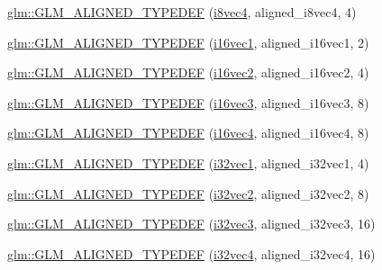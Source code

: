 \begin{DoxyCompactItemize}
\item 
\mbox{\hyperlink{group__gtx__type__aligned_ga1fe6fc032a978f1c845fac9aa0668714}{glm\+::\+G\+L\+M\+\_\+\+A\+L\+I\+G\+N\+E\+D\+\_\+\+T\+Y\+P\+E\+D\+EF}} (\mbox{\hyperlink{group__gtc__type__precision_gafbf10a778016eba57d44beb585f2dc49}{i8vec4}}, aligned\+\_\+i8vec4, 4)
\item 
\mbox{\hyperlink{group__gtx__type__aligned_gaa4161e7a496dc96972254143fe873e55}{glm\+::\+G\+L\+M\+\_\+\+A\+L\+I\+G\+N\+E\+D\+\_\+\+T\+Y\+P\+E\+D\+EF}} (\mbox{\hyperlink{group__gtc__type__precision_gacec84a02174e44363dd105769fb22473}{i16vec1}}, aligned\+\_\+i16vec1, 2)
\item 
\mbox{\hyperlink{group__gtx__type__aligned_ga9d7cb211ccda69b1c22ddeeb0f3e7aba}{glm\+::\+G\+L\+M\+\_\+\+A\+L\+I\+G\+N\+E\+D\+\_\+\+T\+Y\+P\+E\+D\+EF}} (\mbox{\hyperlink{group__gtc__type__precision_ga37af364ff13fb791571dd324dfd3ca89}{i16vec2}}, aligned\+\_\+i16vec2, 4)
\item 
\mbox{\hyperlink{group__gtx__type__aligned_gaaee91dd2ab34423bcc11072ef6bd0f02}{glm\+::\+G\+L\+M\+\_\+\+A\+L\+I\+G\+N\+E\+D\+\_\+\+T\+Y\+P\+E\+D\+EF}} (\mbox{\hyperlink{group__gtc__type__precision_ga85e903f028d903b416a1119b00af57ea}{i16vec3}}, aligned\+\_\+i16vec3, 8)
\item 
\mbox{\hyperlink{group__gtx__type__aligned_ga49f047ccaa8b31fad9f26c67bf9b3510}{glm\+::\+G\+L\+M\+\_\+\+A\+L\+I\+G\+N\+E\+D\+\_\+\+T\+Y\+P\+E\+D\+EF}} (\mbox{\hyperlink{group__gtc__type__precision_gaf074450c0e60b45114084b1df4012a1d}{i16vec4}}, aligned\+\_\+i16vec4, 8)
\item 
\mbox{\hyperlink{group__gtx__type__aligned_ga904e9c2436bb099397c0823506a0771f}{glm\+::\+G\+L\+M\+\_\+\+A\+L\+I\+G\+N\+E\+D\+\_\+\+T\+Y\+P\+E\+D\+EF}} (\mbox{\hyperlink{group__gtc__type__precision_ga05a766bbe2ad0791ed0081baac492da7}{i32vec1}}, aligned\+\_\+i32vec1, 4)
\item 
\mbox{\hyperlink{group__gtx__type__aligned_gaf90651cf2f5e7ee2b11cfdc5a6749534}{glm\+::\+G\+L\+M\+\_\+\+A\+L\+I\+G\+N\+E\+D\+\_\+\+T\+Y\+P\+E\+D\+EF}} (\mbox{\hyperlink{group__gtc__type__precision_ga25820e641988fe33b075d80434872d02}{i32vec2}}, aligned\+\_\+i32vec2, 8)
\item 
\mbox{\hyperlink{group__gtx__type__aligned_ga7354a4ead8cb17868aec36b9c30d6010}{glm\+::\+G\+L\+M\+\_\+\+A\+L\+I\+G\+N\+E\+D\+\_\+\+T\+Y\+P\+E\+D\+EF}} (\mbox{\hyperlink{group__gtc__type__precision_gab67e08f6a4b1bce82a9a34ecb2bfba64}{i32vec3}}, aligned\+\_\+i32vec3, 16)
\item 
\mbox{\hyperlink{group__gtx__type__aligned_gad2ecbdea18732163e2636e27b37981ee}{glm\+::\+G\+L\+M\+\_\+\+A\+L\+I\+G\+N\+E\+D\+\_\+\+T\+Y\+P\+E\+D\+EF}} (\mbox{\hyperlink{group__gtc__type__precision_ga3ada3676600db65a425058c0a150d83e}{i32vec4}}, aligned\+\_\+i32vec4, 16)

\end{DoxyCompactItemize}
